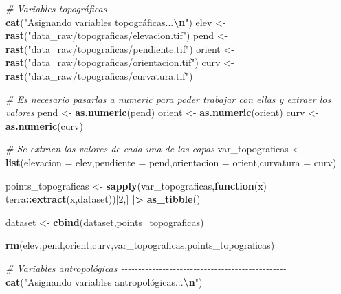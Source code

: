 \documentclass[12pt,a4paper,]{book}
\newenvironment{Shaded}{\begin{snugshade}}{\end{snugshade}}
\newcommand{\AttributeTok}[1]{\textcolor[rgb]{0.13,0.29,0.53}{#1}}
\newcommand{\CommentTok}[1]{\textcolor[rgb]{0.56,0.35,0.01}{\textit{#1}}}
\newcommand{\ControlFlowTok}[1]{\textcolor[rgb]{0.13,0.29,0.53}{\textbf{#1}}}
\newcommand{\DecValTok}[1]{\textcolor[rgb]{0.00,0.00,0.81}{#1}}
\newcommand{\FunctionTok}[1]{\textcolor[rgb]{0.13,0.29,0.53}{\textbf{#1}}}
\newcommand{\NormalTok}[1]{#1}
\newcommand{\OtherTok}[1]{\textcolor[rgb]{0.56,0.35,0.01}{#1}}
\newcommand{\SpecialCharTok}[1]{\textcolor[rgb]{0.81,0.36,0.00}{\textbf{#1}}}
\newcommand{\StringTok}[1]{\textcolor[rgb]{0.31,0.60,0.02}{#1}}
\numberwithin{dummy}{section}
\theoremstyle{ocrenumbox}
\theoremstyle{blacknumex}
\theoremstyle{blacknumbox}
\theoremstyle{ocrenum}
\theoremstyle{ocrenum}
\begin{document}
\begin{Shaded}
\begin{Highlighting}[]
  
  \CommentTok{\# Variables topográficas {-}{-}{-}{-}{-}{-}{-}{-}{-}{-}{-}{-}{-}{-}{-}{-}{-}{-}{-}{-}{-}{-}{-}{-}{-}{-}{-}{-}{-}{-}{-}{-}{-}{-}{-}{-}{-}{-}{-}{-}{-}{-}{-}{-}{-}{-}{-}{-}{-}{-}}
  \FunctionTok{cat}\NormalTok{(}\StringTok{"Asignando variables topográficas...}\SpecialCharTok{\textbackslash{}n}\StringTok{"}\NormalTok{)}
\NormalTok{  elev }\OtherTok{\textless{}{-}} \FunctionTok{rast}\NormalTok{(}\StringTok{"data\_raw/topograficas/elevacion.tif"}\NormalTok{)}
\NormalTok{  pend }\OtherTok{\textless{}{-}} \FunctionTok{rast}\NormalTok{(}\StringTok{"data\_raw/topograficas/pendiente.tif"}\NormalTok{)}
\NormalTok{  orient }\OtherTok{\textless{}{-}} \FunctionTok{rast}\NormalTok{(}\StringTok{"data\_raw/topograficas/orientacion.tif"}\NormalTok{)}
\NormalTok{  curv }\OtherTok{\textless{}{-}} \FunctionTok{rast}\NormalTok{(}\StringTok{"data\_raw/topograficas/curvatura.tif"}\NormalTok{)}
  
  \CommentTok{\# Es necesario pasarlas a numeric para poder trabajar con ellas y extraer los valores}
\NormalTok{  pend }\OtherTok{\textless{}{-}} \FunctionTok{as.numeric}\NormalTok{(pend)}
\NormalTok{  orient }\OtherTok{\textless{}{-}} \FunctionTok{as.numeric}\NormalTok{(orient)}
\NormalTok{  curv }\OtherTok{\textless{}{-}} \FunctionTok{as.numeric}\NormalTok{(curv)}
  
  \CommentTok{\# Se extraen los valores de cada una de las capas}
\NormalTok{  var\_topograficas }\OtherTok{\textless{}{-}} \FunctionTok{list}\NormalTok{(}\AttributeTok{elevacion =}\NormalTok{ elev,}\AttributeTok{pendiente =}\NormalTok{ pend,}\AttributeTok{orientacion =}\NormalTok{ orient,}\AttributeTok{curvatura =}\NormalTok{ curv)}
  
\NormalTok{  points\_topograficas }\OtherTok{\textless{}{-}} \FunctionTok{sapply}\NormalTok{(var\_topograficas,}\ControlFlowTok{function}\NormalTok{(x) terra}\SpecialCharTok{::}\FunctionTok{extract}\NormalTok{(x,dataset))[}\DecValTok{2}\NormalTok{,] }\SpecialCharTok{|\textgreater{}} 
    \FunctionTok{as\_tibble}\NormalTok{()}
  
\NormalTok{  dataset }\OtherTok{\textless{}{-}} \FunctionTok{cbind}\NormalTok{(dataset,points\_topograficas)}
  
  \FunctionTok{rm}\NormalTok{(elev,pend,orient,curv,var\_topograficas,points\_topograficas)}
  
  
  \CommentTok{\# Variables antropológicas {-}{-}{-}{-}{-}{-}{-}{-}{-}{-}{-}{-}{-}{-}{-}{-}{-}{-}{-}{-}{-}{-}{-}{-}{-}{-}{-}{-}{-}{-}{-}{-}{-}{-}{-}{-}{-}{-}{-}{-}{-}{-}{-}{-}{-}{-}{-}{-}}
  \FunctionTok{cat}\NormalTok{(}\StringTok{"Asignando variables antropológicas...}\SpecialCharTok{\textbackslash{}n}\StringTok{"}\NormalTok{)}
  

\end{Highlighting}
\end{Shaded}
\end{document}
